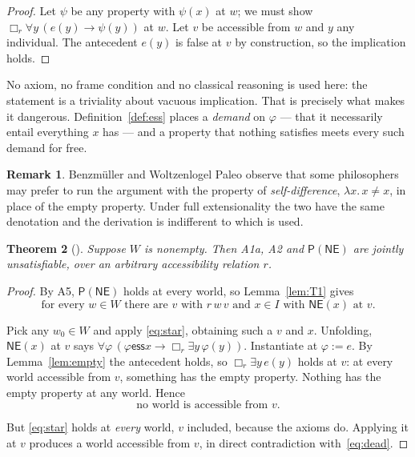 \documentclass[11pt]{article}
\theoremstyle{plain}
\newtheorem{theorem}{Theorem}
\theoremstyle{definition}
\newtheorem{remark}[theorem]{Remark}
\newcommand{\ess}{\mathrel{\mathsf{ess}}}
\newcommand{\NE}{\mathsf{NE}}
\newcommand{\Pos}{\mathsf{P}}
\begin{document}
\begin{proof}
Let $\psi$ be any property with $\psi(x)$ at $w$; we must show
$\Box_r \forall y\,(e(y) \to \psi(y))$ at $w$. Let $v$ be accessible from $w$
and $y$ any individual. The antecedent $e(y)$ is false at $v$ by construction,
so the implication holds.
\end{proof}

\noindent
No axiom, no frame condition and no classical reasoning is used here: the
statement is a triviality about vacuous implication. That is precisely what
makes it dangerous. Definition~\ref{def:ess} places a \emph{demand} on
$\varphi$ --- that it necessarily entail everything $x$ has --- and a property
that nothing satisfies meets every such demand for free.

\begin{remark}
Benzm\"uller and Woltzenlogel Paleo observe that some philosophers may prefer
to run the argument with the property of \emph{self-difference},
$\lambda x.\, x \neq x$, in place of the empty property. Under full
extensionality the two have the same denotation and the derivation is
indifferent to which is used.
\end{remark}

\begin{theorem}[\cite{bwp2016}]\label{thm:main}
Suppose $W$ is nonempty. Then {\rm A1a}, {\rm A2} and $\Pos(\NE)$ are jointly
unsatisfiable, over an arbitrary accessibility relation $r$.
\end{theorem}

\begin{proof}
By A5, $\Pos(\NE)$ holds at every world, so Lemma~\ref{lem:T1} gives
\begin{equation}\label{eq:star}
  \text{for every } w \in W \text{ there are } v \text{ with } r\,w\,v
  \text{ and } x \in I \text{ with } \NE(x) \text{ at } v. \tag{$*$}
\end{equation}

Pick any $w_0 \in W$ and apply \eqref{eq:star}, obtaining such a $v$ and $x$.
Unfolding, $\NE(x)$ at $v$ says
$\forall \varphi\,(\varphi \ess x \to \Box_r \exists y\, \varphi(y))$.
Instantiate at $\varphi := e$. By Lemma~\ref{lem:empty} the antecedent holds,
so $\Box_r \exists y\, e(y)$ holds at $v$: at every world accessible from $v$,
something has the empty property. Nothing has the empty property at any world.
Hence
\begin{equation}\label{eq:dead}
  \text{no world is accessible from } v. \tag{$\dagger$}
\end{equation}

But \eqref{eq:star} holds at \emph{every} world, $v$ included, because the
axioms do. Applying it at $v$ produces a world accessible from $v$, in direct
contradiction with~\eqref{eq:dead}.
\end{proof}
\end{document}
